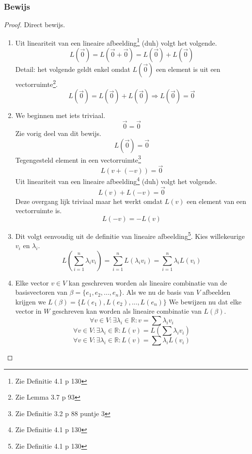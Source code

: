 \documentclass[lineaire_algebra_oplossingen.tex]{subfiles}
\begin{document}
\subsubsection*{Bewijs}
\begin{proof}
Direct bewijs.
\begin{enumerate}
\item
Uit lineariteit van een lineaire afbeelding\footnote{Zie Definitie 4.1 p 130} (duh) volgt het volgende.
\[
L(\vec{0}) = L(\vec{0} + \vec{0}) = L(\vec{0}) + L(\vec{0})
\]
Detail: het volgende geldt enkel omdat $L(\vec{0})$ een element is uit een vectorruimte\footnote{Zie Lemma 3.7 p 93}.
\[
L(\vec{0}) = L(\vec{0}) + L(\vec{0}) \Rightarrow L(\vec{0}) = \vec{0}
\]
\item
We beginnen met iets triviaal.
\[\vec{0}=\vec{0}\]
Zie vorig deel van dit bewijs.
\[L(\vec{0}) = \vec{0}\]
Tegengesteld element in een vectorruimte\footnote{Zie Definitie 3.2 p 88 puntje 3}
\[L(v + (-v)) = \vec{0}\]
Uit lineariteit van een lineaire afbeelding\footnote{Zie Definitie 4.1 p 130} (duh) volgt het volgende.
\[L(v) + L(-v) = \vec{0}\]
Deze overgang lijk triviaal maar het werkt omdat $L(v)$ een element van een vectorruimte is.
\[L(-v) = - L(v)\]
\item
Dit volgt eenvoudig uit de definitie van lineaire afbeelding\footnote{Zie Definitie 4.1 p 130}. Kies willekeurige $v_i$ en $\lambda_i$.
\[L\left(\sum_{i=1}^n\lambda_iv_i\right) =  \sum_{i=1}^nL(\lambda_iv_i)= \sum_{i=1}^n\lambda_iL(v_i)\]
\item
Elke vector $v\in V$ kan geschreven worden als lineaire combinatie van de basisvectoren van $\beta = \{e_1,e_2,...,e_n\}$. Als we nu de basis van $V$ afbeelden krijgen we $L(\beta) = \{L(e_1),L(e_2),...,L(e_n)\}$ We bewijzen nu dat elke vector in $W$ geschreven kan worden als lineaire combinatie van $L(\beta)$.
\[
\forall v \in V:\exists\lambda_i \in \mathbb{R}: v= \sum\lambda_iv_i
\]
\[
\forall v \in V:\exists\lambda_i \in \mathbb{R}: L(v)= L(\sum\lambda_iv_i)
\]
\[
\forall v \in V:\exists\lambda_i \in \mathbb{R}: L(v)= \sum\lambda_iL(v_i)
\]
\end{enumerate}
\end{proof}
\end{document}
